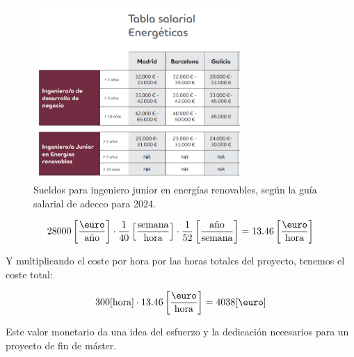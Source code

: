 \begin{figure}[h] \centering
	\centering
	\includegraphics[width=0.7\textwidth]{./capitulos/planificacion_presupuesto/images/engineer_wage.png}
	\caption{Sueldos para ingeniero junior en energías renovables, según la guía salarial de adecco para 2024.}
	\label{fig:engineer_wage}
\end{figure}

\begin{equation}
	28000 \left[\frac{\text{\euro}}{\text{año}} \right] \cdot \frac{1}{40} \left[\frac{\text{semana}}{\text{hora}}\right] \cdot \frac{1}{52} \left[\frac{\text{año}}{\text{semana}}\right] = 13.46 \left[\frac{\text{\euro}}{\text{hora}}\right]
\end{equation}

Y multiplicando el coste por hora por las horas totales del proyecto, tenemos
el coste total:

\begin{equation}
	300 [\text{hora}] \cdot 13.46 \left[\frac{\text{\euro}}{\text{hora}}\right] = 4038 [\text{\euro}]
\end{equation}

Este valor monetario da una idea del esfuerzo y la dedicación necesarios para
un proyecto de fin de máster.
